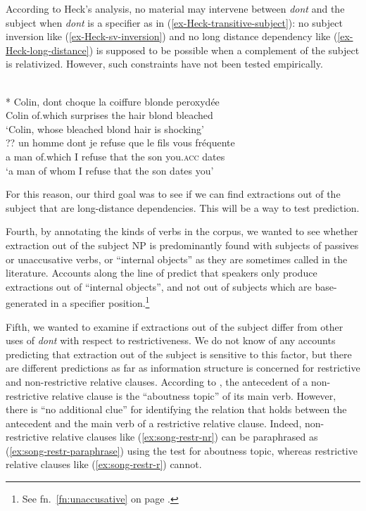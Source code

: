 According to Heck's analysis, no material may intervene between \emph{dont} and the subject when \emph{dont} is a specifier as in (\ref{ex-Heck-transitive-subject}): no subject inversion like (\ref{ex-Heck-sv-inversion}) and no long distance dependency like (\ref{ex-Heck-long-distance}) is supposed to be possible when a complement of the subject is relativized. However, such constraints have not been tested empirically.

\eal\label{ex-Heck}
\ex \citep{Heck.2009}\\
* \gll Colin, dont choque la coiffure blonde peroxydée\\
Colin of.which surprises the hair blond bleached\\
\glt `Colin, whose bleached blond hair is shocking'
\label{ex-Heck-sv-inversion}
\ex \citep{Tellier.1991} \\
?? \gll un homme dont je refuse que le fils vous fréquente\\
a man of.which I refuse that the son you.\textsc{acc} dates\\
\glt `a man of whom I refuse that the son dates you'
\label{ex-Heck-long-distance}
\zl 

For this reason, our third goal was to see if we can find extractions out of the subject that are long-distance dependencies. This will be a way to test  prediction. 

Fourth, by annotating the kinds of verbs in the corpus, we wanted to see whether extraction out of the subject NP is predominantly found with subjects of passives or unaccusative verbs, or ``internal objects'' as they are sometimes called in the literature. Accounts along the line of \citet{Chomsky.2008} predict that speakers only produce extractions out of ``internal objects'', and not out of subjects which are base-generated in a specifier position.\footnote{See fn.\ \ref{fn:unaccusative} on page \pageref{fn:unaccusative}.}

Fifth, we wanted to examine if extractions out of the subject differ from other uses of \emph{dont} with respect to restrictiveness. We do not know of any accounts predicting that extraction out of the subject is sensitive to this factor, but there are different predictions as far as information structure is concerned for restrictive and non-restrictive relative clauses. According to \citet[181--186]{Song.2017}, the antecedent of a non-restrictive relative clause is the ``aboutness topic'' of its main verb. However, there is ``no additional clue''  for identifying the relation that holds between the antecedent and the main verb of a restrictive relative clause. Indeed, non-restrictive relative clauses like (\ref{ex:song-restr-nr}) can be paraphrased as (\ref{ex:song-restr-paraphrase}) using the test for aboutness topic, whereas restrictive relative clauses like (\ref{ex:song-restr-r}) cannot. 

